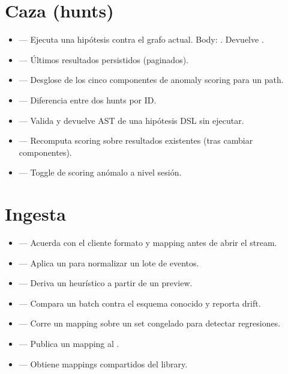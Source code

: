 \section{Caza (hunts)}

\begin{itemize}
    \item {} — Ejecuta una hipótesis contra el
    grafo actual. Body: . Devuelve
    .
    \item {} — Últimos resultados persistidos
    (paginados).
    \item {} — Desglose de los cinco
    componentes de anomaly scoring para un path.
    \item {} — Diferencia entre dos hunts por
    ID.
    \item {} — Valida y devuelve AST de una
    hipótesis DSL sin ejecutar.
    \item {} — Recomputa scoring sobre
    resultados existentes (tras cambiar componentes).
    \item {} — Toggle de scoring
    anómalo a nivel sesión.
\end{itemize}

\section{Ingesta}

\begin{itemize}
    \item {} — Acuerda con el cliente
    formato y mapping antes de abrir el stream.
    \item {} — Aplica un 
    para normalizar un lote de eventos.
    \item {} — Deriva un 
    heurístico a partir de un preview.
    \item {} — Compara un batch contra
    el esquema conocido y reporta drift.
    \item {} — Corre un mapping
    sobre un set congelado para detectar regresiones.
    \item {} — Publica un mapping al
    .
    \item {} — Obtiene mappings
    compartidos del library.
\end{itemize}

